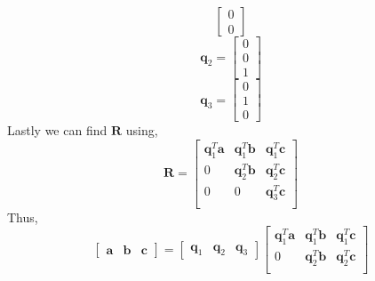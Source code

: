 \begin{mdframed}[style=MyFrame]
\begin{equation}
\begin{bmatrix}
            0   \\
            0
        \end{bmatrix}
    \end{equation}
    \begin{equation}
        \mathbf{q}_{2} =  
        \begin{bmatrix}
            0   \\
            0   \\
            1
        \end{bmatrix}
    \end{equation}
    \begin{equation}
        \mathbf{q}_{3} =  
        \begin{bmatrix}
            0   \\
            1   \\
            0
        \end{bmatrix}
    \end{equation}
    Lastly we can find $\mathbf{R}$ using,
    \begin{equation}
        \mathbf{R} =
        \begin{bmatrix}
            \mathbf{q}_{1}^{T}\mathbf{a}    &   \mathbf{q}_{1}^{T}\mathbf{b}    &   \mathbf{q}_{1}^{T}  \mathbf{c}  \\
            0                               &   \mathbf{q}_{2}^{T}\mathbf{b}    &   \mathbf{q}_{2}^{T}  \mathbf{c}  \\
            0                               &   0                               &   \mathbf{q}_{3}^{T}  \mathbf{c}  \\
        \end{bmatrix}
    \end{equation}
    Thus,
    \begin{equation}
        \begin{bmatrix}
            \mathbf{a}      &       \mathbf{b}      &   \mathbf{c}  
        \end{bmatrix}
        = 
        \begin{bmatrix}
            \mathbf{q}_{1}  &       \mathbf{q}_{2}  &   \mathbf{q}_{3}  
        \end{bmatrix}
        \begin{bmatrix}
            \mathbf{q}_{1}^{T}\mathbf{a}    &   \mathbf{q}_{1}^{T}\mathbf{b}    &   \mathbf{q}_{1}^{T}  \mathbf{c}  \\
            0                               &   \mathbf{q}_{2}^{T}\mathbf{b}    &   \mathbf{q}_{2}^{T}  \mathbf{c}  \\

\end{bmatrix}
\end{equation}
\end{mdframed}
